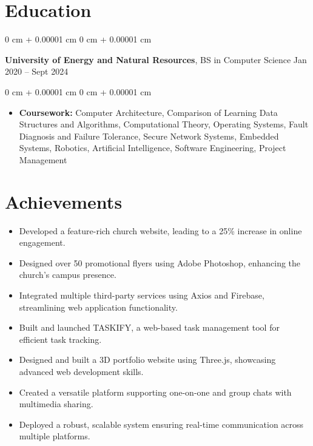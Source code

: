 \documentclass[10pt, letterpaper]{article}
\newenvironment{highlights}{
    \begin{itemize}[
        topsep=0.10 cm,
        parsep=0.10 cm,
        partopsep=0pt,
        itemsep=0pt,
        leftmargin=0 cm + 10pt
    ]
}{
    \end{itemize}
} %
\newenvironment{onecolentry}{
    \begin{adjustwidth}{
        0 cm + 0.00001 cm
    }{
        0 cm + 0.00001 cm
    }
}{
    \end{adjustwidth}
} %
\newenvironment{twocolentry}[2][]{
    \onecolentry
    \def\secondColumn{#2}
    \setcolumnwidth{\fill, 4.5 cm}
    \begin{paracol}{2}
}{
    \switchcolumn \raggedleft \secondColumn
    \end{paracol}
    \endonecolentry
} %
\begin{document}
\section{Education}
\begin{twocolentry}{
        Jan 2020 – Sept 2024
    }
    \textbf{University of Energy and Natural Resources}, BS in Computer Science\end{twocolentry}

\vspace{0.10 cm}
\begin{onecolentry}
    \begin{highlights}
        \item \textbf{Coursework:} Computer Architecture, Comparison of Learning Data Structures and Algorithms, Computational Theory, Operating Systems, Fault Diagnosis and Failure Tolerance, Secure Network Systems, Embedded Systems, Robotics, Artificial Intelligence, Software Engineering, Project Management

    \end{highlights}
\end{onecolentry}

\vspace{0.20 cm}

\section{Achievements}

\begin{itemize}
    \item Developed a feature-rich church website, leading to a 25\% increase in online
          engagement.
    \item Designed over 50 promotional flyers using Adobe Photoshop, enhancing the
          church's campus presence.
    \item Integrated multiple third-party services using Axios and Firebase, streamlining
          web application functionality.
    \item Built and launched TASKIFY, a web-based task management tool for efficient task
          tracking.
    \item Designed and built a 3D portfolio website using Three.js, showcasing advanced
          web development skills.
    \item Created a versatile platform supporting one-on-one and group chats with
          multimedia sharing.
    \item Deployed a robust, scalable system ensuring real-time communication across
          multiple platforms.
\end{itemize}
\end{document}
